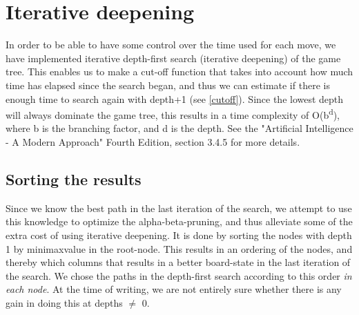 \section{Iterative deepening}
In order to be able to have some control over the time used for each move, we have implemented iterative depth-first search (iterative deepening) of the game tree. This enables us to make a cut-off function that takes into account how much time has elapsed since the search began, and thus we can estimate if there is enough time to search again with depth+1 (see \ref{cutoff}). 
Since the lowest depth will always dominate the game tree, this results in a time complexity of O(b\textsuperscript{d}), where b is the branching factor, and d is the depth. See the "Artificial Intelligence - A Modern Approach" Fourth Edition, section 3.4.5 for more details.

\subsection{Sorting the results}
Since we know the best path in the last iteration of the search, we attempt to use this knowledge to optimize the alpha-beta-pruning, and thus alleviate some of the extra cost of using iterative deepening. It is done by sorting the nodes with depth 1 by minimaxvalue in the root-node. This results in an ordering of the nodes, and thereby which columns that results in a better board-state in the last iteration of the search. We chose the paths in the depth-first search according to this order \emph{in each node}. At the time of writing, we are not entirely sure whether there is any gain in doing this at depths \begin{math}\neq\end{math} 0.